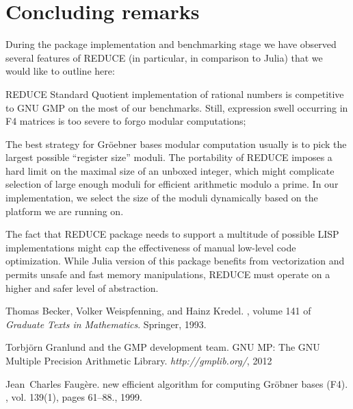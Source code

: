 \documentclass{article}
\begin{document}
\section{Concluding remarks}

During the package implementation and benchmarking stage we have observed several features of REDUCE 
(in particular, in comparison to Julia) that we would like to outline here:
%
\begin{description}
	\item REDUCE Standard Quotient implementation of rational numbers is competitive to GNU GMP \cite{GMP}
	on the most of our benchmarks.
	Still, expression swell occurring in F4 matrices is too severe to forgo modular computations;
	\item The best strategy for Gr{\"o}ebner bases modular computation usually is 
	to pick the largest possible ``register size'' moduli. The portability of REDUCE imposes 
	a hard limit on the maximal size of an unboxed integer, which might complicate selection 
	of large enough moduli for efficient arithmetic modulo a prime.
	In our implementation, we select the size of the moduli dynamically based on 
	the platform we are running on.
	\item The fact that REDUCE package needs to support a multitude of 
	possible LISP implementations might cap the effectiveness of manual 
	low-level code optimization. While Julia version of this package benefits 
	from vectorization and permits unsafe and fast memory manipulations, 
	REDUCE must operate on a higher and safer level of abstraction.
\end{description}

\begin{thebibliography}{BWK93}

Thomas Becker, Volker Weispfenning, and Hainz Kredel.
, volume 141 of {\em Graduate Texts in
  Mathematics}.
\newblock Springer, 1993.

Torbj{\"o}rn Granlund and the GMP development team.
\newblock GNU MP: The GNU Multiple Precision Arithmetic Library.
\newblock \emph{http://gmplib.org/}, 2012

Jean~Charles Faugère.
 new efficient algorithm for computing {G}r{\"o}bner bases ({F}4).
, vol. 139(1), pages 61--88., 1999.

\end{thebibliography}

%
%
\end{document}
